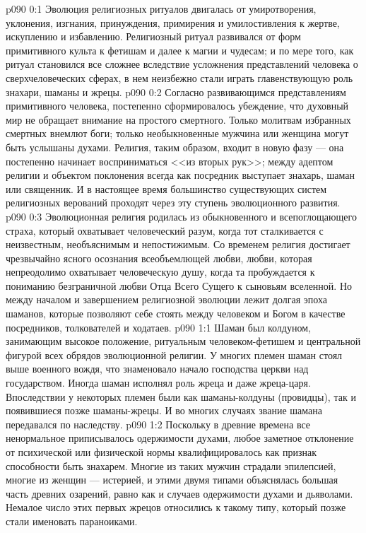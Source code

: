 \vs p090 0:1 Эволюция религиозных ритуалов двигалась от умиротворения, уклонения, изгнания, принуждения, примирения и умилостивления к жертве, искуплению и избавлению. Религиозный ритуал развивался от форм примитивного культа к фетишам и далее к магии и чудесам; и по мере того, как ритуал становился все сложнее вследствие усложнения представлений человека о сверхчеловеческих сферах, в нем неизбежно стали играть главенствующую роль знахари, шаманы и жрецы.
\vs p090 0:2 Согласно развивающимся представлениям примитивного человека, постепенно сформировалось убеждение, что духовный мир не обращает внимание на простого смертного. Только молитвам избранных смертных внемлют боги; только необыкновенные мужчина или женщина могут быть услышаны духами. Религия, таким образом, входит в новую фазу --- она постепенно начинает восприниматься <<из вторых рук>>; между адептом религии и объектом поклонения всегда как посредник выступает знахарь, шаман или священник. И в настоящее время большинство существующих систем религиозных верований проходят через эту ступень эволюционного развития.
\vs p090 0:3 Эволюционная религия родилась из обыкновенного и всепоглощающего страха, который охватывает человеческий разум, когда тот сталкивается с неизвестным, необъяснимым и непостижимым. Со временем религия достигает чрезвычайно ясного осознания всеобъемлющей любви, любви, которая непреодолимо охватывает человеческую душу, когда та пробуждается к пониманию безграничной любви Отца Всего Сущего к сыновьям вселенной. Но между началом и завершением религиозной эволюции лежит долгая эпоха шаманов, которые позволяют себе стоять между человеком и Богом в качестве посредников, толкователей и ходатаев.
\vs p090 1:1 Шаман был колдуном, занимающим высокое положение, ритуальным человеком\hyp{}фетишем и центральной фигурой всех обрядов эволюционной религии. У многих племен шаман стоял выше военного вождя, что знаменовало начало господства церкви над государством. Иногда шаман исполнял роль жреца и даже жреца\hyp{}царя. Впоследствии у некоторых племен были как шаманы\hyp{}колдуны (провидцы), так и появившиеся позже шаманы\hyp{}жрецы. И во многих случаях звание шамана передавался по наследству.
\vs p090 1:2 Поскольку в древние времена все ненормальное приписывалось одержимости духами, любое заметное отклонение от психической или физической нормы квалифицировалось как признак способности быть знахарем. Многие из таких мужчин страдали эпилепсией, многие из женщин --- истерией, и этими двумя типами объяснялась большая часть древних озарений, равно как и случаев одержимости духами и дьяволами. Немалое число этих первых жрецов относились к такому типу, который позже стали именовать параноиками.
